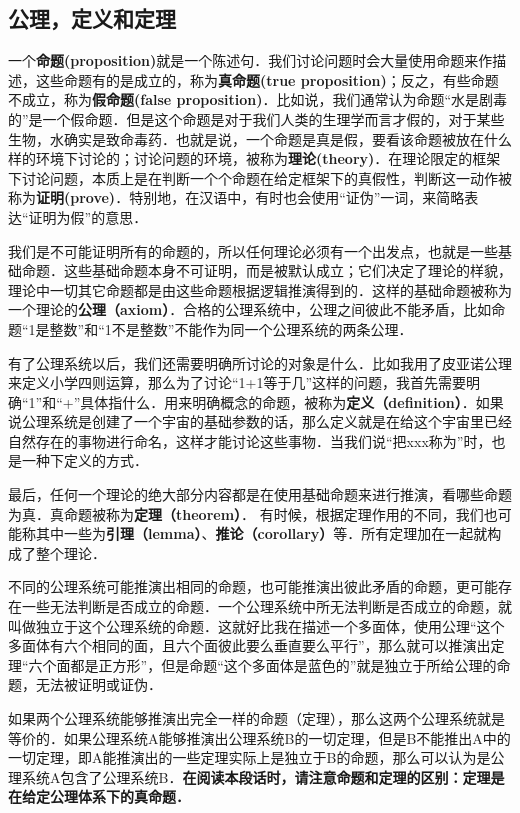 
\subsection{公理，定义和定理}
一个\textbf{命题(proposition)}就是一个陈述句．我们讨论问题时会大量使用命题来作描述，这些命题有的是成立的，称为\textbf{真命题(true proposition)}；反之，有些命题不成立，称为\textbf{假命题(false proposition)}．比如说，我们通常认为命题“水是剧毒的”是一个假命题．但是这个命题是对于我们人类的生理学而言才假的，对于某些生物，水确实是致命毒药．也就是说，一个命题是真是假，要看该命题被放在什么样的环境下讨论的；讨论问题的环境，被称为\textbf{理论(theory)}．在理论限定的框架下讨论问题，本质上是在判断一个个命题在给定框架下的真假性，判断这一动作被称为\textbf{证明(prove)}．特别地，在汉语中，有时也会使用“证伪”一词，来简略表达“证明为假”的意思．

我们是不可能证明所有的命题的，所以任何理论必须有一个出发点，也就是一些基础命题．这些基础命题本身不可证明，而是被默认成立；它们决定了理论的样貌，理论中一切其它命题都是由这些命题根据逻辑推演得到的．这样的基础命题被称为一个理论的\textbf{公理（axiom）}．合格的公理系统中，公理之间彼此不能矛盾，比如命题“1是整数”和“1不是整数”不能作为同一个公理系统的两条公理．

有了公理系统以后，我们还需要明确所讨论的对象是什么．比如我用了皮亚诺公理来定义小学四则运算，那么为了讨论“1+1等于几”这样的问题，我首先需要明确“1”和“+”具体指什么．用来明确概念的命题，被称为\textbf{定义（definition）}．如果说公理系统是创建了一个宇宙的基础参数的话，那么定义就是在给这个宇宙里已经自然存在的事物进行命名，这样才能讨论这些事物．当我们说“把xxx称为”时，也是一种下定义的方式．

最后，任何一个理论的绝大部分内容都是在使用基础命题来进行推演，看哪些命题为真．真命题被称为\textbf{定理（theorem）}． 有时候，根据定理作用的不同，我们也可能称其中一些为\textbf{引理（lemma）}、\textbf{推论（corollary）}等．所有定理加在一起就构成了整个理论．

不同的公理系统可能推演出相同的命题，也可能推演出彼此矛盾的命题，更可能存在一些无法判断是否成立的命题．一个公理系统中所无法判断是否成立的命题，就叫做独立于这个公理系统的命题．这就好比我在描述一个多面体，使用公理“这个多面体有六个相同的面，且六个面彼此要么垂直要么平行”，那么就可以推演出定理“六个面都是正方形”，但是命题“这个多面体是蓝色的”就是独立于所给公理的命题，无法被证明或证伪．


如果两个公理系统能够推演出完全一样的命题（定理），那么这两个公理系统就是等价的．如果公理系统A能够推演出公理系统B的一切定理，但是B不能推出A中的一切定理，即A能推演出的一些定理实际上是独立于B的命题，那么可以认为是公理系统A包含了公理系统B．\textbf{在阅读本段话时，请注意命题和定理的区别：定理是在给定公理体系下的真命题．}

